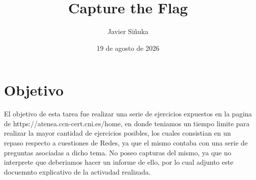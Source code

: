 \documentclass[11pt,a4paper]{article}
\title{Capture the Flag}
\author{Javier Siñuka}
\date{19 de agosto de 2026}
\begin{document}
\maketitle

\section{Objetivo}

El objetivo de esta tarea fue realizar una serie de ejercicios expuestos en la pagina de 
https://atenea.ccn-cert.cni.es/home, en donde teniamos un tiempo limite para realizar la mayor cantidad
de ejercicios posibles, los cuales consistian en un repaso respecto a cuestiones de Redes, ya que 
el mismo contaba con una serie de preguntas asociadas a dicho tema.
No poseo capturas del mismo, ya que no interprete que deberiamos hacer un informe de ello, por lo cual
adjunto este docuemnto explicativo de la activadad realizada.
\end{document}
